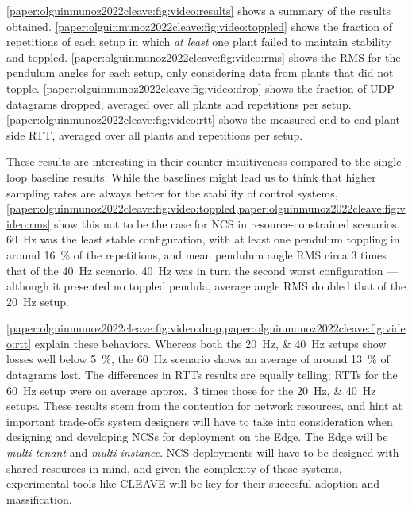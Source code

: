 \cref{paper:olguinmunoz2022cleave:fig:video:results} shows a summary of the results obtained.
\cref{paper:olguinmunoz2022cleave:fig:video:toppled} shows the fraction of repetitions of each setup in which \emph{at least} one plant failed to maintain stability and toppled.
\cref{paper:olguinmunoz2022cleave:fig:video:rms} shows the \gls{RMS} for the pendulum angles for each setup, only considering data from plants that did not topple.
\cref{paper:olguinmunoz2022cleave:fig:video:drop} shows the fraction of \gls{UDP} datagrams dropped, averaged over all plants and repetitions per setup.
\cref{paper:olguinmunoz2022cleave:fig:video:rtt} shows the measured end-to-end plant-side \gls{RTT}, averaged over all plants and repetitions per setup.

These results are interesting in their counter-intuitiveness compared to the single-loop baseline results.
While the baselines might lead us to think that higher sampling rates are always better for the stability of control systems, \cref{paper:olguinmunoz2022cleave:fig:video:toppled,paper:olguinmunoz2022cleave:fig:video:rms} show this not to be the case for \gls{NCS} in resource-constrained scenarios.
\SI{60}{\hertz} was the least stable configuration, with at least one pendulum toppling in around \SI{16}{\percent} of the repetitions, and mean pendulum angle \gls{RMS} circa \num{3} times that of the \SI{40}{\hertz} scenario.
\SI{40}{\hertz} was in turn the second worst configuration --- although it presented no toppled pendula, average angle \gls{RMS} doubled that of the \SI{20}{\hertz} setup.

\cref{paper:olguinmunoz2022cleave:fig:video:drop,paper:olguinmunoz2022cleave:fig:video:rtt} explain these behaviors.
Whereas both the \SIlist{20;40}{\hertz} setups show losses well below \SI{5}{\percent}, the \SI{60}{\hertz} scenario shows an average of around \SI{13}{\percent} of datagrams lost.
The differences in \glspl{RTT} results are equally telling; \glspl{RTT} for the \SI{60}{\hertz} setup were on average approx.\ \num{3} times those for the \SIlist{20;40}{\hertz} setups.
These results stem from the contention for network resources, and hint at important trade-offs system designers will have to take into consideration when designing and developing \glspl{NCS} for deployment on the Edge.
The Edge will be \emph{multi-tenant} and \emph{multi-instance}. 
\gls{NCS} deployments will have to be designed with shared resources in mind, and given the complexity of these systems, experimental tools like \gls{CLEAVE} will be key for their succesful adoption and massification.
